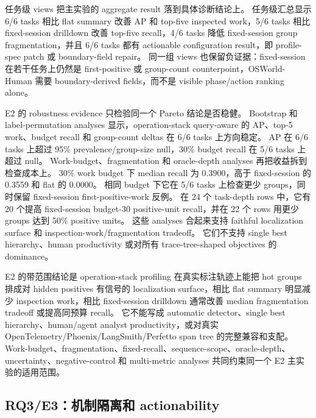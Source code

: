 \documentclass[10pt,twocolumn]{ctexart}
\begin{document}
任务级 views 把主实验的 aggregate result 落到具体诊断结论上。
任务级汇总显示 6/6 tasks 相比 flat summary 改善 AP 和 top-five inspected work，5/6 tasks 相比 fixed-session drilldown 改善 top-five recall，4/6 tasks 降低 fixed-session group fragmentation，并且 6/6 tasks 都有 actionable configuration result，即 profile-spec patch 或 boundary-field repair。
同一组 views 也保留负证据：fixed-session 在若干任务上仍然是 first-positive 或 group-count counterpoint，OSWorld-Human 需要 boundary-derived fields，而不是 visible phase/action ranking alone。

E2 的 robustness evidence 只检验同一个 Pareto 结论是否稳健。
Bootstrap 和 label-permutation analyses 显示，operation-stack query-aware 的 AP、top-5 work、budget recall 和 group-count deltas 在 6/6 tasks 上方向稳定。
AP 在 6/6 tasks 上超过 95\% prevalence/group-size null，30\% budget recall 在 5/6 tasks 上超过 null。
Work-budget、fragmentation 和 oracle-depth analyses 再把收益拆到检查成本上。
30\% work budget 下 median recall 为 0.3900，高于 fixed-session 的 0.3559 和 flat 的 0.0000。
相同 budget 下它在 5/6 tasks 上检查更少 groups，同时保留 fixed-session first-positive-work 反例。
在 24 个 task-depth rows 中，它有 20 个提高 fixed-session budget-30 positive-unit recall，并在 22 个 rows 用更少 groups 达到 50\% positive units。
这些 analyses 合起来支持 faithful localization surface 和 inspection-work/fragmentation tradeoff。
它们不支持 single best hierarchy、human productivity 或对所有 trace-tree-shaped objectives 的 dominance。

E2 的带范围结论是 operation-stack profiling 在真实标注轨迹上能把 hot groups 排成对 hidden positives 有信号的 localization surface，相比 flat summary 明显减少 inspection work，相比 fixed-session drilldown 通常改善 median fragmentation tradeoff 或提高同预算 recall。
它不能写成 automatic detector、single best hierarchy、human/agent analyst productivity，或对真实 OpenTelemetry/Phoenix/LangSmith/Perfetto span tree 的完整兼容和支配。
Work-budget、fragmentation、fixed-recall、sequence-scope、oracle-depth、uncertainty、negative-control 和 multi-metric analyses 共同约束同一个 E2 主实验的适用范围。

\subsection{RQ3/E3：机制隔离和 actionability}
\end{document}
